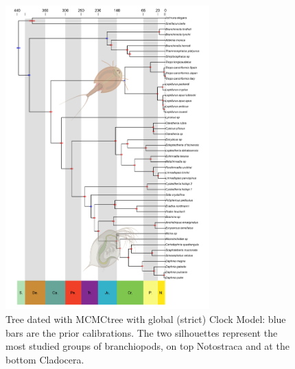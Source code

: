 \begin{figure}[h!]
    \centering
    \includegraphics[width=0.7\textwidth]{Figures/mcmctree_strict_2.0.png}
    \caption[Tree dated with MCMCtree with strict Clock Model]{Tree dated with MCMCtree with global (strict) Clock Model: blue bars are the prior calibrations. The two silhouettes represent the most studied groups of branchiopods, on top Notostraca and at the bottom Cladocera.
}
    \label{fig:mcmctree_strict}
\end{figure}


